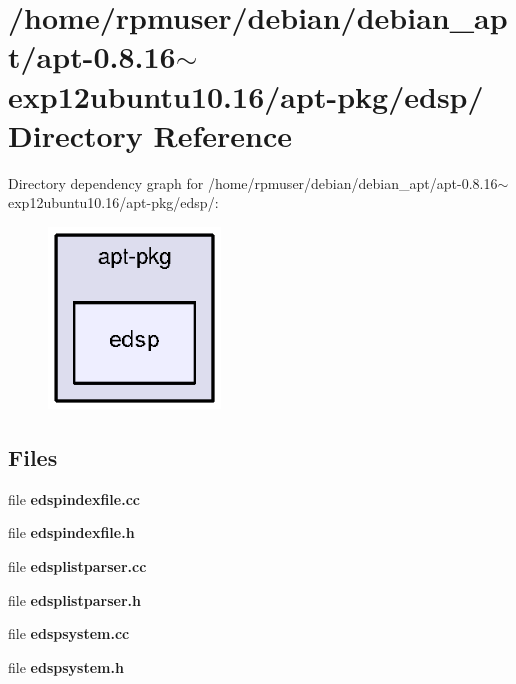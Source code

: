 \section{/home/rpmuser/debian/debian\-\_\-apt/apt-\/0.8.16$\sim$exp12ubuntu10.16/apt-\/pkg/edsp/ \-Directory \-Reference}
\label{dir_043736eac7a5d874a8c338eff5e9abac}
\-Directory dependency graph for /home/rpmuser/debian/debian\-\_\-apt/apt-\/0.8.16$\sim$exp12ubuntu10.16/apt-\/pkg/edsp/\-:
\nopagebreak
\begin{figure}[H]
\begin{center}
\leavevmode
\includegraphics[width=130pt]{dir_043736eac7a5d874a8c338eff5e9abac_dep}
\end{center}
\end{figure}
\subsection*{\-Files}
\begin{DoxyCompactItemize}
\item 
file {\bfseries edspindexfile.\-cc}
\item 
file {\bfseries edspindexfile.\-h}
\item 
file {\bfseries edsplistparser.\-cc}
\item 
file {\bfseries edsplistparser.\-h}
\item 
file {\bfseries edspsystem.\-cc}
\item 
file {\bfseries edspsystem.\-h}
\end{DoxyCompactItemize}
